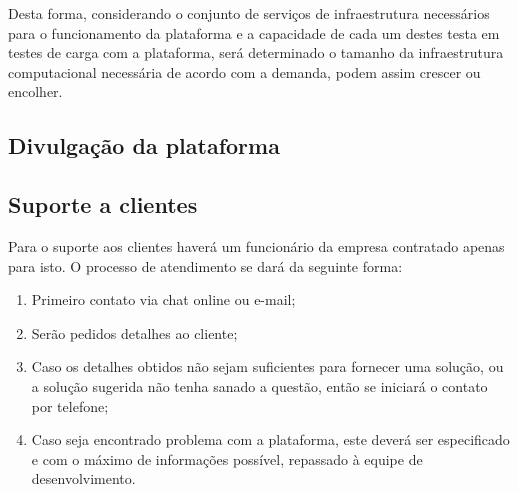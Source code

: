   Desta forma, considerando o conjunto de serviços de infraestrutura necessários para o funcionamento da plataforma e a capacidade de cada um destes testa em testes de carga com a plataforma, será determinado o tamanho da infraestrutura computacional necessária de acordo com a demanda, podem assim crescer ou encolher.
  
  \subsection{Divulgação da plataforma}
  
  \subsection{Suporte a clientes}
  Para o suporte aos clientes haverá um funcionário da empresa contratado apenas para isto. O processo de atendimento se dará da seguinte forma:
  
  \begin{enumerate}
    \item Primeiro contato via chat online ou e-mail;
    \item Serão pedidos detalhes ao cliente;
    \item Caso os detalhes obtidos não sejam suficientes para fornecer uma solução, ou a solução sugerida não tenha sanado a questão, então se iniciará o contato por telefone;
    \item Caso seja encontrado problema com a plataforma, este deverá ser especificado e com o máximo de informações possível, repassado à equipe de desenvolvimento.
  \end{enumerate}
